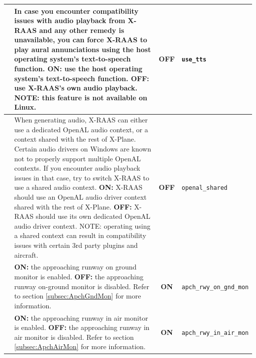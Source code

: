 \documentclass[a4paper,12pt]{article}
\newcommand{\confopt}[1]{\texttt{#1}}
\begin{document}
{\begin{center}
\begin{supertabular}{|c|p{8cm}|c|l|}
\hline

 &
In case you encounter compatibility issues with audio playback from
X-RAAS and any other remedy is unavailable, you can force X-RAAS to play
aural annunciations using the host operating system's text-to-speech
function.\newline
\textbf{ON:} use the host operating system's text-to-speech function.\newline
\textbf{OFF:} use X-RAAS's own audio playback.\newline
NOTE: this feature is not available on Linux. & \textbf{OFF} &
\confopt{use\_tts} \\

\hline

 &
When generating audio, X-RAAS can either use a dedicated OpenAL audio
context, or a context shared with the rest of X-Plane. Certain audio
drivers on Windows are known not to properly support multiple OpenAL
contexts. If you encounter audio playback issues in that case, try to
switch X-RAAS to use a shared audio context.\newline
\textbf{ON:} X-RAAS should use an OpenAL audio driver context shared with
the rest of X-Plane.\newline
\textbf{OFF:} X-RAAS should use its own dedicated OpenAL audio driver
context.\newline
NOTE: operating using a shared context can result in compatibility issues
with certain 3rd party plugins and aircraft. & \textbf{OFF} &
\confopt{openal\_shared} \\

\hline

 &
\textbf{ON:} the approaching runway on ground monitor is enabled.\newline
\textbf{OFF:} the approaching runway on-ground monitor is disabled.\newline
Refer to section \ref{subsec:ApchGndMon} for more information. &
\textbf{ON} & \confopt{apch\_rwy\_on\_gnd\_mon} \\

\hline

 &
\textbf{ON:} the approaching runway in air monitor is enabled.\newline
\textbf{OFF:} the approaching runway in air monitor is disabled.\newline
Refer to section \ref{subsec:ApchAirMon} for more information. &
\textbf{ON} & \confopt{apch\_rwy\_in\_air\_mon} \\


\end{supertabular}
\end{center}}
\end{document}
